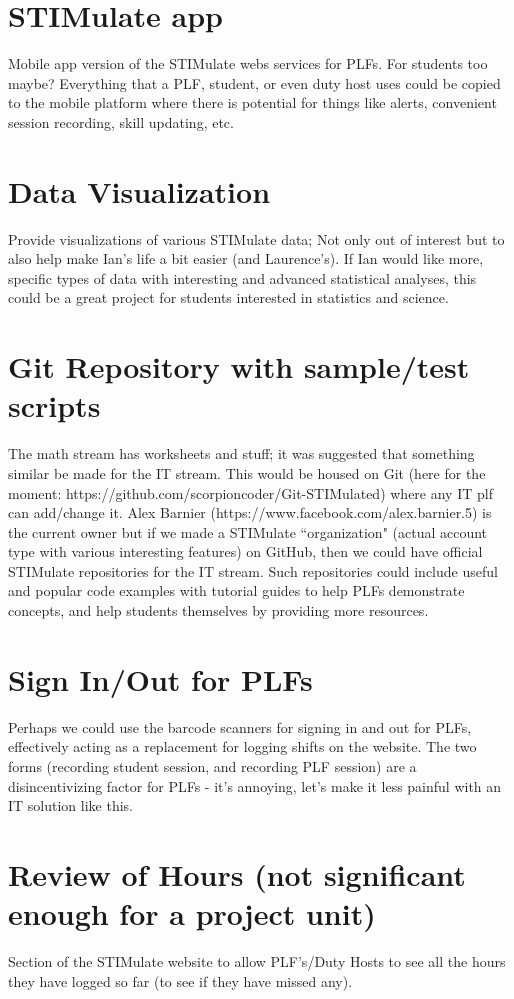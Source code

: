 \documentclass[]{article}
\begin{document}
\section{STIMulate app}
Mobile app version of the STIMulate webs services for PLFs. For students too maybe? Everything that a PLF, student, or even duty host uses could be copied to the mobile platform where there is potential for things like alerts, convenient session recording, skill updating, etc.

\section{Data Visualization}
Provide visualizations of various STIMulate data; Not only out of interest but to also help make Ian’s life a bit easier (and Laurence’s). If Ian would like more, specific types of data with interesting and advanced statistical analyses, this could be a great project for students interested in statistics and science.

\section{Git Repository with sample/test scripts}
The math stream has worksheets and stuff; it was suggested that something similar be made for the IT stream. This would be housed on Git (here for the moment: https://github.com/scorpioncoder/Git-STIMulated) where any IT plf can add/change it. Alex Barnier (https://www.facebook.com/alex.barnier.5) is the current owner but if we made a STIMulate ``organization" (actual account type with various interesting features) on GitHub, then we could have official STIMulate repositories for the IT stream. Such repositories could include useful and popular code examples with tutorial guides to help PLFs demonstrate concepts, and help students themselves by providing more resources.

\section{Sign In/Out for PLFs}
Perhaps we could use the barcode scanners for signing in and out for PLFs, effectively acting as a replacement for logging shifts on the website. The two forms (recording student session, and recording PLF session) are a disincentivizing factor for PLFs - it's annoying, let's make it less painful with an IT solution like this.  
 
\section{Review of Hours (not significant enough for a project unit)}
Section of the STIMulate website to allow PLF’s/Duty Hosts to see all the hours they have logged so far (to see if they have missed any).
\end{document}
